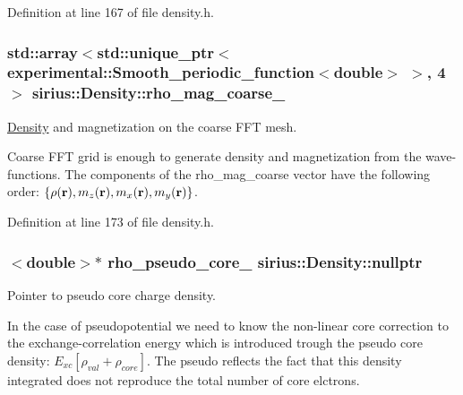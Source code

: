 Definition at line 167 of file density.\+h.

\hypertarget{classsirius_1_1_density_af4aa8524e5c20a5dcac6f178daa368aa}{}
\subsubsection[{rho\+\_\+mag\+\_\+coarse\+\_\+}]{\setlength{\rightskip}{0pt plus 5cm}std\+::array$<$std\+::unique\+\_\+ptr$<${\bf experimental\+::\+Smooth\+\_\+periodic\+\_\+function}$<$double$>$ $>$, 4$>$ sirius\+::\+Density\+::rho\+\_\+mag\+\_\+coarse\+\_\+\hspace{0.3cm}{\ttfamily [private]}}\label{classsirius_1_1_density_af4aa8524e5c20a5dcac6f178daa368aa}


\hyperlink{classsirius_1_1_density}{Density} and magnetization on the coarse F\+F\+T mesh. 

Coarse F\+F\+T grid is enough to generate density and magnetization from the wave-\/functions. The components of the {\ttfamily rho\+\_\+mag\+\_\+coarse} vector have the following order\+: $ \{\rho({\bf r}), m_z({\bf r}), m_x({\bf r}), m_y({\bf r}) \} $. 

Definition at line 173 of file density.\+h.

\hypertarget{classsirius_1_1_density_af12e5c3f7ce7767fa506e0bbd169ade3}{}
\subsubsection[{nullptr}]{$<$double$>$$\ast$ rho\+\_\+pseudo\+\_\+core\+\_\+ sirius\+::\+Density\+::nullptr\hspace{0.3cm}{\ttfamily [private]}}\label{classsirius_1_1_density_af12e5c3f7ce7767fa506e0bbd169ade3}


Pointer to pseudo core charge density. 

In the case of pseudopotential we need to know the non-\/linear core correction to the exchange-\/correlation energy which is introduced trough the pseudo core density\+: $ E_{xc}[\rho_{val} + \rho_{core}] $. The \textquotesingle{}pseudo\textquotesingle{} reflects the fact that this density integrated does not reproduce the total number of core elctrons. 

